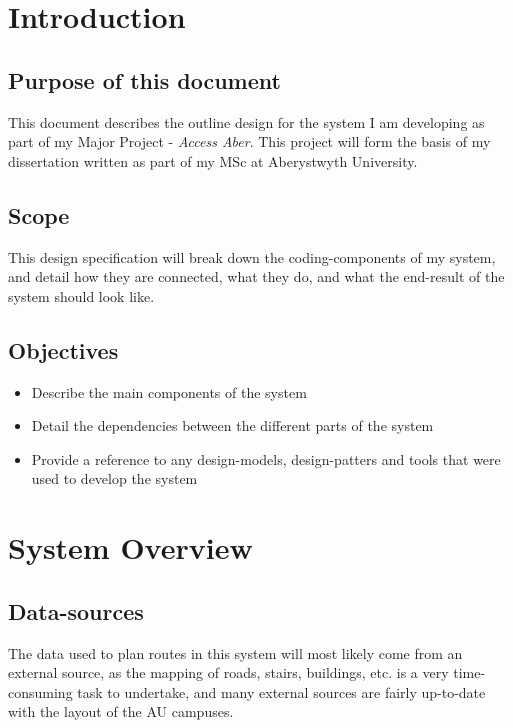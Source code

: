 \documentclass[conference]{IEEEtran}
\begin{document}
\clearpage
\section{Introduction}
\subsection{Purpose of this document}
This document describes the outline design for the system I am developing as part of my Major Project - \textit{Access Aber}. This project will form the basis of my dissertation written as part of my MSc at Aberystwyth University.

\subsection{Scope}
This design specification will break down the coding-components of my system, and detail how they are connected, what they do, and what the end-result of the system should look like.

\subsection{Objectives}
\begin{itemize}
	\item Describe the main components of the system
	\item Detail the dependencies between the different parts of the system
	\item Provide a reference to any design-models, design-patters and tools that were used to develop the system
\end{itemize}

\section{System Overview}
\subsection{Data-sources}
The data used to plan routes in this system will most likely come from an external source, as the mapping of roads, stairs, buildings, etc. is a very time-consuming task to undertake, and many external sources are fairly up-to-date with the layout of the AU campuses.
\end{document}
